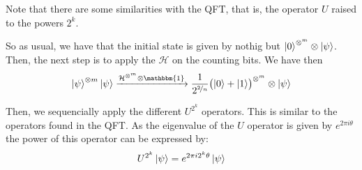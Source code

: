 Note that there are some similarities with the QFT, that is, the operator $U$ raised to the powers $2^{k}$. 

So as usual, we have that the initial state is given by nothig but $\ket{0}^{\otimes^m}\otimes \ket{\psi}$. Then, the next step is to apply the $\mathcal{H}$ 
on the counting bits. We have then 
\begin{gather}
  \ket{\psi}^{\otimes m}\ket{\psi} \xrightarrow{\mathcal{H}^{\otimes^m}\otimes \mathbbm{1}} \frac{1}{2^{\nicefrac{2}{n}}} \bigl (\ket{0} + \ket{1} \bigr)^{\otimes^{m}}\otimes \ket{\psi}
\end{gather}

Then, we sequencially apply the different $U^{2^k}$ operators. This is similar to the operators found in the QFT. As the eigenvalue of the $U$ operator 
is given by $e^{2\pi i \theta}$ the power of this operator can be expressed by: 
\begin{gather}
  U^{2^k}\ket{\psi} = e^{2\pi i 2^{k}\theta}\ket{\psi}
\end{gather}

